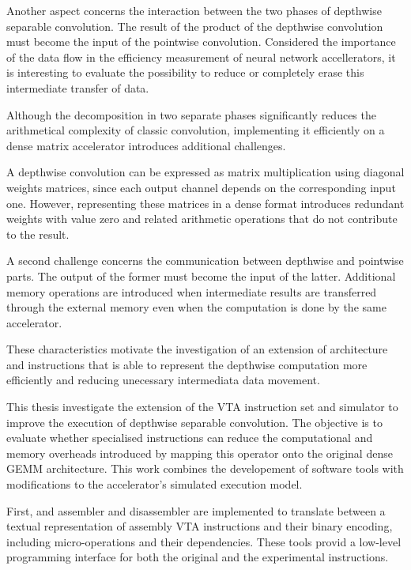 \documentclass[oneside, binding=0.6cm]{sapthesis}
\begin{document}
	Another aspect concerns the interaction between the two phases of depthwise separable convolution. The result of the product of the depthwise convolution must become the input of the pointwise convolution. Considered the importance of the data flow in the efficiency measurement of neural network accellerators,\cite{7738524} it is interesting to evaluate the possibility to reduce or completely erase this intermediate transfer of data.
	
	Although the decomposition in two separate phases significantly reduces the arithmetical complexity of classic convolution, implementing it efficiently on a dense matrix accelerator introduces additional challenges.
	
	A depthwise convolution can be expressed as matrix multiplication using diagonal weights matrices, since each output channel depends on the corresponding input one. However, representing these matrices in a dense format introduces redundant weights with value zero and related arithmetic operations that do not contribute to the result.
	
	A second challenge concerns the communication between depthwise and pointwise parts. The output of the former must become the input of the latter. Additional memory operations are introduced when intermediate results are transferred through the external memory even when the computation is done by the same accelerator.
	
	These characteristics motivate the investigation of an extension of architecture and instructions that is able to represent the depthwise computation more efficiently and reducing unecessary intermediata data movement.
	
	This thesis investigate the extension of the \gls{VTA} instruction set and simulator to improve the execution of depthwise separable convolution. The objective is to evaluate whether specialised instructions can reduce the computational and memory overheads introduced by mapping this operator onto the original dense \gls{GEMM} architecture. This work combines the developement of software tools with modifications to the accelerator's simulated execution model.
	
	First, and assembler and disassembler are implemented to translate between a textual representation of assembly \gls{VTA} instructions and their binary encoding, including micro-operations and their dependencies.
	These tools provid a low-level programming interface for both the original and the experimental instructions.
	
\end{document}
